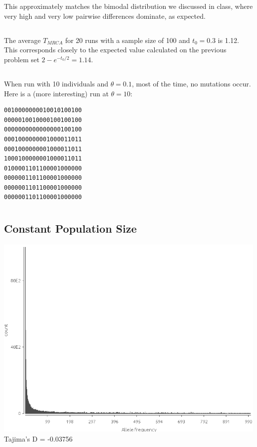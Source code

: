 \documentclass{article}
\begin{document}
\section{}
\subsection{}

This approximately matches the bimodal distribution we discussed in class, where
very high and very low pairwise differences dominate, as expected.
\subsection{}
The average $T_{MRCA}$ for 20 runs with a sample size of 100 and $t_0 = 0.3$ is
1.12.  This corresponds closely to the expected value calculated on the previous
problem set $2 - e^{-t_0/2} = 1.14$.
\subsection{}
\subsubsection{}
When run with 10 individuals and $\theta = 0.1$, most of the time, no mutations
occur.  Here is a (more interesting) run at $\theta = 10$:
\begin{verbatim}
0010000000010010100100
0000010010000100100100
0000000000000000100100
0001000000001000011011
0001000000001000011011
1000100000001000011011
0100001101100001000000
0000001101100001000000
0000001101100001000000
0000001101100001000000
\end{verbatim}
\subsubsection{}
\section{}
\subsection{Constant Population Size}
\includegraphics[width=\textwidth]{constant_size}
Tajima's D = -0.03756
\end{document}
